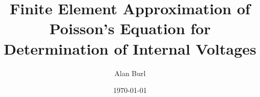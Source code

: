 \documentclass[12pt]{article}
\title{Finite Element Approximation of Poisson's Equation for Determination of Internal Voltages}
\author{Alan Burl}
\date{\today{}}
\begin{document}
\doublespacing
\maketitle
	
	
	
	
	
	\clearpage
	
	
\end{document}

